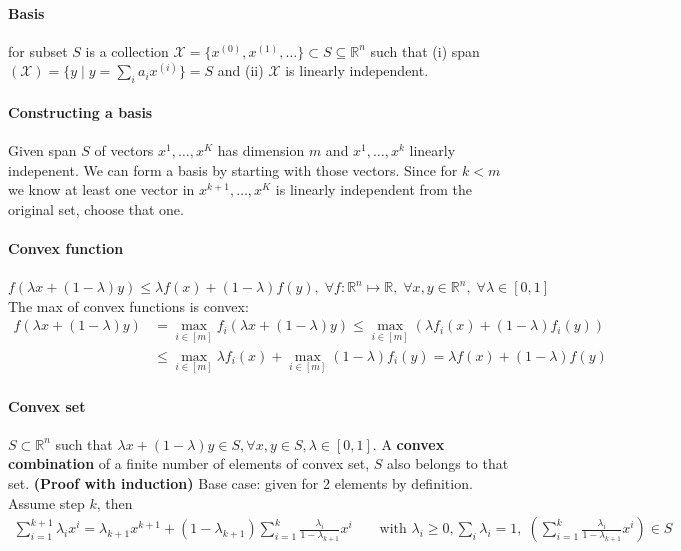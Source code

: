 \documentclass{article}
\begin{document}
\paragraph{Basis} for subset $S$ is a collection $\mathcal X = \{x^{(0)}, x^{(1)},\dots\}\subset S \subseteq \mathbb R^n$ such that (i) span$(\mathcal X) = \{y\mid y=\sum_i a_ix^{(i)}\} = S$ and (ii) $\mathcal X$ is linearly independent.

\paragraph{Constructing a basis} Given span $S$ of vectors $x^1, \dots, x^K$ has dimension $m$ and $x^1, \dots, x^k$ linearly indepenent. We can form a basis by starting with those vectors. Since for $k < m$ we know at least one vector in $x^{k+1},\dots, x^K$ is linearly independent from the original set, choose that one.

\paragraph{Convex function} $ f(\lambda x + (1 - \lambda)y)\leq \lambda f(x) + (1-\lambda)f(y), \; \forall f:\mathbb R^n  \mapsto \mathbb R,\; \forall x,y \in \mathbb R^n,\; \forall \lambda \in [0, 1]$
\newline\noindent The max of convex functions is convex: 
\begin{align*}
    f(\lambda x + (1 - \lambda)y) &= \max_{i\in[m]}f_i(\lambda x + (1 - \lambda)y) \leq \max_{i\in[m]}\left(\lambda f_i(x) + (1 - \lambda)f_i(y)\right)\\
    &\leq \max_{i\in[m]}\lambda f_i(x) + \max_{i\in[m]}(1 - \lambda)f_i(y) = \lambda f(x) + (1 - \lambda)f(y)
\end{align*}
\paragraph{Convex set} $S \subset \mathbb R^n$ such that $\lambda x + (1 - \lambda)y \in S, \forall x,y \in S, \lambda \in [0,1]$. A \textbf{convex combination} of a finite number of elements of convex set, $S$ also belongs to that set. \textbf{(Proof with induction)} Base case: given for 2 elements by definition. Assume step $k$, then
\begin{align*}
    \sum_{i=1}^{k+1}\lambda_i x^i = \lambda_{k+1}x^{k+1} + (1 - \lambda_{k+1})\sum_{i=1}^k \frac{\lambda_i}{1 - \lambda_{k+1}}x^i && \text{ with }\lambda_i \geq 0, \sum_i\lambda_i = 1,\; \left(\sum_{i=1}^k \frac{\lambda_i}{1 - \lambda_{k+1}}x^i\right) \in S
\end{align*}
\end{document}
